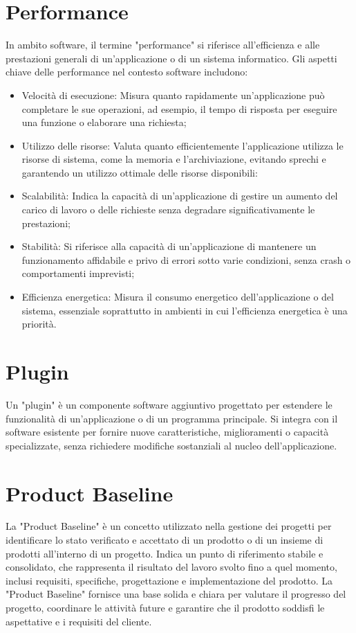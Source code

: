 \documentclass{article}
\begin{document}
\section{Performance}
In ambito software, il termine "performance" si riferisce all'efficienza e alle prestazioni generali di un'applicazione o di un sistema informatico. Gli aspetti chiave delle performance nel contesto software includono:
\begin{itemize}
    \item Velocità di esecuzione: Misura quanto rapidamente un'applicazione può completare le sue operazioni, ad esempio, il tempo di risposta per eseguire una funzione o elaborare una richiesta;
    \item Utilizzo delle risorse: Valuta quanto efficientemente l'applicazione utilizza le risorse di sistema, come la memoria e l'archiviazione, evitando sprechi e garantendo un utilizzo ottimale delle risorse disponibili:
    \item Scalabilità: Indica la capacità di un'applicazione di gestire un aumento del carico di lavoro o delle richieste senza degradare significativamente le prestazioni;
    \item Stabilità: Si riferisce alla capacità di un'applicazione di mantenere un funzionamento affidabile e privo di errori sotto varie condizioni, senza crash o comportamenti imprevisti;
    \item Efficienza energetica: Misura il consumo energetico dell'applicazione o del sistema, essenziale soprattutto in ambienti in cui l'efficienza energetica è una priorità.
\end{itemize}

\section{Plugin}
Un "plugin" è un componente software aggiuntivo progettato per estendere le funzionalità di un'applicazione o di un programma principale. Si integra con il software esistente per fornire nuove caratteristiche, miglioramenti o capacità specializzate, senza richiedere modifiche sostanziali al nucleo dell'applicazione. 

\section{Product Baseline}
La "Product Baseline" è un concetto utilizzato nella gestione dei progetti per identificare lo stato verificato e accettato di un prodotto o di un insieme di prodotti all'interno di un progetto. Indica un punto di riferimento stabile e consolidato, che rappresenta il risultato del lavoro svolto fino a quel momento, inclusi requisiti, specifiche, progettazione e implementazione del prodotto. La "Product Baseline" fornisce una base solida e chiara per valutare il progresso del progetto, coordinare le attività future e garantire che il prodotto soddisfi le aspettative e i requisiti del cliente.
\end{document}
